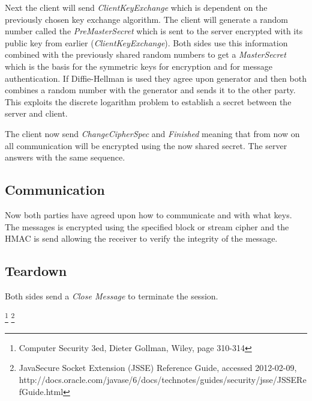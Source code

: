 \documentclass[10pt, a4paper]{article}
\begin{document}
Next the client will send \emph{ClientKeyExchange} which is dependent on the previously chosen key exchange algorithm. The client will generate a random number called the \emph{PreMasterSecret} which is sent to the server encrypted with its public key from earlier (\emph{ClientKeyExchange}). Both sides use this information combined with the previously shared random numbers to get a \emph{MasterSecret} which is the basis for the symmetric keys for encryption and for message authentication. If Diffie-Hellman is used they agree upon generator and then both combines a random number with the generator and sends it to the other party. This exploits the discrete logarithm problem to establish a secret between the server and client. %

The client now send \emph{ChangeCipherSpec} and \emph{Finished} meaning that from now on all communication will be encrypted using the now shared secret. The server answers with the same sequence.

\subsection{Communication}
Now both parties have agreed upon how to communicate and with what keys. The messages is encrypted using the specified block or stream cipher and the HMAC is send allowing the receiver to verify the integrity of the message.

\subsection{Teardown}
Both sides send a \emph{Close Message} to terminate the session.


\footnote{Computer Security 3ed, Dieter Gollman, Wiley, page 310-314}
\footnote{Java\textregistered Secure Socket Extension (JSSE) Reference Guide, accessed 2012-02-09, http://docs.oracle.com/javase/6/docs/technotes/guides/security/jsse/JSSERefGuide.html}
\end{document}
